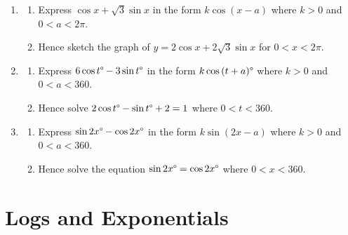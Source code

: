 \documentclass[
  11pt,
  openany]{book}
\begin{document}
\begin{enumerate}
\begin{enumerate}
\begin{enumerate}
            \item The maximum value of $2\sin{x}\degree-4\cos{x}\degree$.
            \item The value of $x$ for which it occurs, where $0<x<360$.\\[0.5em]
        \end{enumerate}
    \end{enumerate}
    \item 
    \begin{enumerate}
        \item Express $\cos{x}+\sqrt{3}\sin{x}$ in the form $k\cos{(x-a)}$ where $k>0$ and $0<a<2\pi$.
        \item Hence sketch the graph of $y=2\cos{x}+2\sqrt{3}\sin{x}$ for $0<x<2\pi$.\\[0.5em]
    \end{enumerate}
    \item 
    \begin{enumerate}
        \item Express $6\cos{t}\degree-3\sin{t}\degree$ in the form $k\cos{(t+a)\degree}$ where $k>0$ and $0<a<360$. \faCalculator
        \item Hence solve $2\cos{t}\degree-\sin{t}\degree+2=1$ where $0<t<360$. \faCalculator\\[0.5em]
    \end{enumerate}
    \item 
    \begin{enumerate}
        \item Express $\sin{2x}\degree-\cos{2x}\degree$ in the form $k\sin{(2x-a)}$ where $k>0$ and $0<a<360$.
        \item Hence solve the equation $\sin{2x}\degree=\cos{2x}\degree$ where $0<x<360$.
    \end{enumerate}
\end{enumerate}

\pagebreak

\chapterfont{\color{white}}

\chapter{Logs and Exponentials}\label{logs-and-exponentials}

\vspace{-12cm}
\begin{center}
\end{center}
\end{document}
